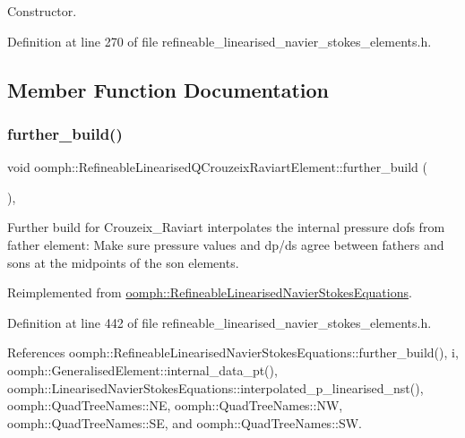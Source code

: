 Constructor. 



Definition at line 270 of file refineable\+\_\+linearised\+\_\+navier\+\_\+stokes\+\_\+elements.\+h.



\subsection{Member Function Documentation}
\mbox{\label{classoomph_1_1RefineableLinearisedQCrouzeixRaviartElement_a175965274f4f4545e086d19f446c9ce9}} 
\subsubsection{\texorpdfstring{further\+\_\+build()}{further\_build()}}
{\footnotesize\ttfamily void oomph\+::\+Refineable\+Linearised\+Q\+Crouzeix\+Raviart\+Element\+::further\+\_\+build (\begin{DoxyParamCaption}{ }\end{DoxyParamCaption})\hspace{0.3cm}{\ttfamily [inline]}, {\ttfamily [virtual]}}

Further build for Crouzeix\+\_\+\+Raviart interpolates the internal pressure dofs from father element\+: Make sure pressure values and dp/ds agree between fathers and sons at the midpoints of the son elements. 

Reimplemented from \hyperlink{classoomph_1_1RefineableLinearisedNavierStokesEquations_a4a160cd28d0a5a865884fd9f27254a2d}{oomph\+::\+Refineable\+Linearised\+Navier\+Stokes\+Equations}.



Definition at line 442 of file refineable\+\_\+linearised\+\_\+navier\+\_\+stokes\+\_\+elements.\+h.



References oomph\+::\+Refineable\+Linearised\+Navier\+Stokes\+Equations\+::further\+\_\+build(), i, oomph\+::\+Generalised\+Element\+::internal\+\_\+data\+\_\+pt(), oomph\+::\+Linearised\+Navier\+Stokes\+Equations\+::interpolated\+\_\+p\+\_\+linearised\+\_\+nst(), oomph\+::\+Quad\+Tree\+Names\+::\+NE, oomph\+::\+Quad\+Tree\+Names\+::\+NW, oomph\+::\+Quad\+Tree\+Names\+::\+SE, and oomph\+::\+Quad\+Tree\+Names\+::\+SW.

